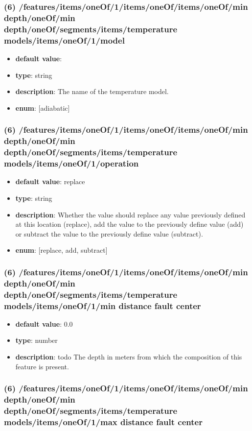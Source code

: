 \subsubsection{(6) /features/items/oneOf/1/items/oneOf/items/oneOf/min depth/oneOf/min depth/oneOf/segments/items/temperature models/items/oneOf/1/model}
\begin{itemize}[leftmargin=6em]\item {\bf default value}: 
\item {\bf type}: string
\item {\bf description}: The name of the temperature model.
\item {\bf enum}: [adiabatic]\end{itemize}\subsubsection{(6) /features/items/oneOf/1/items/oneOf/items/oneOf/min depth/oneOf/min depth/oneOf/segments/items/temperature models/items/oneOf/1/operation}
\begin{itemize}[leftmargin=6em]\item {\bf default value}: replace
\item {\bf type}: string
\item {\bf description}: Whether the value should replace any value previously defined at this location (replace), add the value to the previously define value (add) or subtract the value to the previously define value (subtract).
\item {\bf enum}: [replace, add, subtract]\end{itemize}\subsubsection{(6) /features/items/oneOf/1/items/oneOf/items/oneOf/min depth/oneOf/min depth/oneOf/segments/items/temperature models/items/oneOf/1/min distance fault center}
\begin{itemize}[leftmargin=6em]\item {\bf default value}: 0.0
\item {\bf type}: number
\item {\bf description}: todo The depth in meters from which the composition of this feature is present.
\end{itemize}\subsubsection{(6) /features/items/oneOf/1/items/oneOf/items/oneOf/min depth/oneOf/min depth/oneOf/segments/items/temperature models/items/oneOf/1/max distance fault center}
